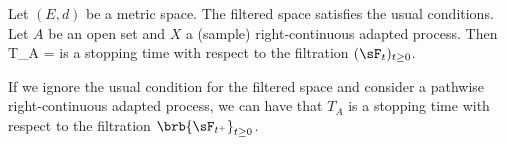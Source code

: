 \begin{proposition}\label{pro:right_continuous_open_set_stopping_time}%
Let $(E,d)$ be a metric space. The filtered space satisfies the usual conditions. Let $A$ be an open set and $X$ a (sample) right-continuous adapted process. Then \be T_A = \inf{} \ee is a stopping
time with respect to the filtration $(\sF_t)_{t\geq 0}$.


If we ignore the usual condition for the filtered space and consider a pathwise right-continuous adapted process, we can have that $T_A$ is a stopping time with respect to the filtration $\brb{\sF_{t^+}}_{t\geq 0}$.
\end{proposition}

